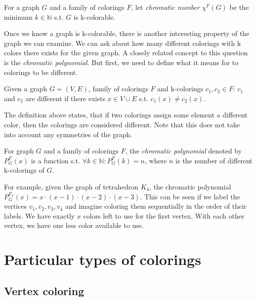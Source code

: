 \begin{definition}
    For a graph $G$ and a family of colorings $F$, let \textit{chromatic number} $\chi ^F (G)$ be the minimum $k \in \mathbb{N}$ s.t. $G$ is k-colorable.
\end{definition}

Once we know a graph is k-colorable, there is another interesting property of the graph we can examine. We can ask about how many different colorings with k colors there exists for the given graph. A closely related concept to this question is the \textit{chromatic polynomial}. But first, we need to define what it means for to colorings to be different.

\begin{definition}
    Given a graph $G=(V,E)$, family of colorings $F$ and k-colorings $c_1,c_2 \in F$: $c_1$ and $c_2$ are different if there exists $x \in V \cup E$ s.t. $c_1(x) \neq c_2(x)$.
\end{definition}

The definition above states, that if two colorings assign some element a different color, then the colorings are considered different. Note that this does not take into account any symmetries of the graph.

\begin{definition}
    For graph $G$ and a family of colorings $F$, the \textit{chromatic polynomial} denoted by $P^{F}_G(x)$ is a function s.t. $\forall k \in \mathbb{N} : P^{F}_G(k) = n$, where $n$ is the number of different k-colorings of $G$.
\end{definition}

For example, given the graph of tetrahedron $K_4$, the chromatic polynomial $P^{F_V}_G(x) = x \cdot (x-1) \cdot (x-2) \cdot (x-3)$. This can be seen if we label the vertices $v_1,v_2,v_3,v_4$ and imagine coloring them sequentially in the order of their labels. We have exactly $x$ colors left to use for the first vertex. With each other vertex, we have one less color available to use. 

\section{Particular types of colorings}

\subsection{Vertex coloring}

